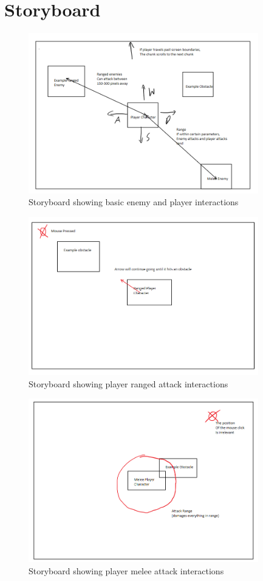 \documentclass[12pt]{article}
\begin{document}
\section{Storyboard}
\begin{figure}[h]
    \centering
    \includegraphics[width = 10cm]{Storyboard0.PNG}
    \caption{Storyboard showing basic enemy and player interactions}
\end{figure}
\begin{figure}[b]
    \centering
    \includegraphics[width = 10cm]{Storyboard1.PNG}
    \caption{Storyboard showing player ranged attack interactions}
\end{figure}
\begin{figure}[h]
    \centering
    \includegraphics[width = 10cm]{Storyboard2.PNG}
    \caption{Storyboard showing player melee attack interactions}
\end{figure}
\end{document}
